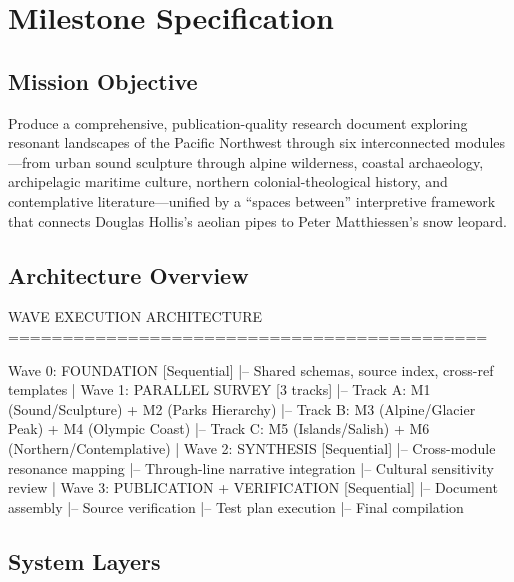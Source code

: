 \documentclass[11pt,letterpaper]{article}
\newcommand{\stageheader}[2]{%
  \noindent\colorbox{#2}{\makebox[\textwidth][l]{%
    \textcolor{white}{\bfseries\sffamily\hspace{6pt}#1\hspace{6pt}}}}%
  \vspace{0.5em}\par%
}
\begin{document}
\newpage

\stageheader{STAGE 3 --- MISSION PACKAGE}{tertiary}

\section{Milestone Specification}

\subsection{Mission Objective}

Produce a comprehensive, publication-quality research document exploring resonant landscapes of the Pacific Northwest through six interconnected modules---from urban sound sculpture through alpine wilderness, coastal archaeology, archipelagic maritime culture, northern colonial-theological history, and contemplative literature---unified by a ``spaces between'' interpretive framework that connects Douglas Hollis's aeolian pipes to Peter Matthiessen's snow leopard.

\subsection{Architecture Overview}

\begin{asciibox}
WAVE EXECUTION ARCHITECTURE
============================================

Wave 0: FOUNDATION [Sequential]
  |-- Shared schemas, source index, cross-ref templates
  |
Wave 1: PARALLEL SURVEY [3 tracks]
  |-- Track A: M1 (Sound/Sculpture) + M2 (Parks Hierarchy)
  |-- Track B: M3 (Alpine/Glacier Peak) + M4 (Olympic Coast)
  |-- Track C: M5 (Islands/Salish) + M6 (Northern/Contemplative)
  |
Wave 2: SYNTHESIS [Sequential]
  |-- Cross-module resonance mapping
  |-- Through-line narrative integration
  |-- Cultural sensitivity review
  |
Wave 3: PUBLICATION + VERIFICATION [Sequential]
  |-- Document assembly
  |-- Source verification
  |-- Test plan execution
  |-- Final compilation
\end{asciibox}

\subsection{System Layers}
\end{document}

